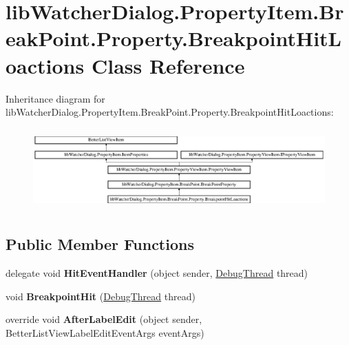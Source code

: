 \hypertarget{classlib_watcher_dialog_1_1_property_item_1_1_break_point_1_1_property_1_1_breakpoint_hit_loactions}{\section{lib\+Watcher\+Dialog.\+Property\+Item.\+Break\+Point.\+Property.\+Breakpoint\+Hit\+Loactions Class Reference}
\label{classlib_watcher_dialog_1_1_property_item_1_1_break_point_1_1_property_1_1_breakpoint_hit_loactions}
}
Inheritance diagram for lib\+Watcher\+Dialog.\+Property\+Item.\+Break\+Point.\+Property.\+Breakpoint\+Hit\+Loactions\+:\begin{figure}[H]
\begin{center}
\leavevmode
\includegraphics[height=3.167421cm]{classlib_watcher_dialog_1_1_property_item_1_1_break_point_1_1_property_1_1_breakpoint_hit_loactions}
\end{center}
\end{figure}
\subsection*{Public Member Functions}
\begin{DoxyCompactItemize}
\item 
\hypertarget{classlib_watcher_dialog_1_1_property_item_1_1_break_point_1_1_property_1_1_breakpoint_hit_loactions_a504e1590f09ff8d70185c0684eb4e42a}{delegate void {\bfseries Hit\+Event\+Handler} (object sender, \hyperlink{classlib_wather_debugger_1_1_thread_1_1_debug_thread}{Debug\+Thread} thread)}\label{classlib_watcher_dialog_1_1_property_item_1_1_break_point_1_1_property_1_1_breakpoint_hit_loactions_a504e1590f09ff8d70185c0684eb4e42a}

\item 
\hypertarget{classlib_watcher_dialog_1_1_property_item_1_1_break_point_1_1_property_1_1_breakpoint_hit_loactions_afbb193af4443224ef2d3434c8bc53142}{void {\bfseries Breakpoint\+Hit} (\hyperlink{classlib_wather_debugger_1_1_thread_1_1_debug_thread}{Debug\+Thread} thread)}\label{classlib_watcher_dialog_1_1_property_item_1_1_break_point_1_1_property_1_1_breakpoint_hit_loactions_afbb193af4443224ef2d3434c8bc53142}

\item 
\hypertarget{classlib_watcher_dialog_1_1_property_item_1_1_break_point_1_1_property_1_1_breakpoint_hit_loactions_a113b24761da5cba54bcacc887e41c422}{override void {\bfseries After\+Label\+Edit} (object sender, Better\+List\+View\+Label\+Edit\+Event\+Args event\+Args)}\label{classlib_watcher_dialog_1_1_property_item_1_1_break_point_1_1_property_1_1_breakpoint_hit_loactions_a113b24761da5cba54bcacc887e41c422}

\end{DoxyCompactItemize}
